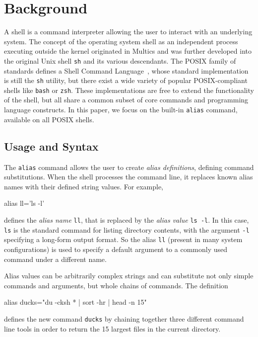 \section{Background}

A shell is a command interpreter allowing the user to interact with an underlying system.
The concept of the operating system shell as an independent process executing outside the kernel originated in Multics and was further developed into the original Unix shell \verb|sh| and its various descendants.
The POSIX family of standards defines a Shell Command Language~\cite{posix_standard, greenberg:17}, whose standard implementation is still the \verb|sh| utility, but there exist a wide variety of popular POSIX-compliant shells like \verb|bash| or \verb|zsh|.
These implementations are free to extend the functionality of the shell, but all share a common subset of core commands and programming language constructs.
In this paper, we focus on the built-in \verb|alias| command, available on all POSIX shells.

\subsection{Usage and Syntax}

The \verb|alias| command allows the user to create \emph{alias definitions}, defining command substitutions.
When the shell processes the command line, it replaces known alias names with their defined string values.
For example, 
\begin{CVerbatim}
alias ll='ls -l'
\end{CVerbatim}
defines the \emph{alias name} \verb|ll|, that is replaced by the \emph{alias value} \verb|ls -l|.
In this case, \verb|ls| is the standard command for listing directory contents, with the argument \verb|-l| specifying a long-form output format.
So the alias \verb|ll| (present in many system configurations) is used to specify a default argument to a commonly used command under a different name.

Alias values can be arbitrarily complex strings and can substitute not only simple commands and arguments, but whole chains of commands. 
The definition
\begin{CVerbatim}
alias ducks="du -cksh * | sort -hr | head -n 15"
\end{CVerbatim}
defines the new command \verb|ducks| by chaining together three different command line tools in order to return the 15 largest files in the current directory.

